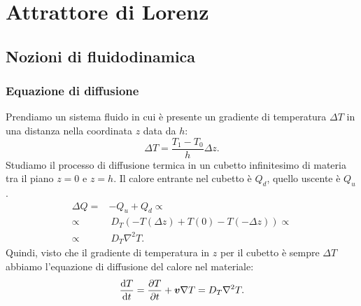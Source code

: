 \section{Attrattore di Lorenz}%
\label{sec:Lezione 24}
\mylocaltoc
\subsection{Nozioni di fluidodinamica}%
\label{sub:Nozioni di fluidodinamica}
\subsubsection{Equazione di diffusione}%
\label{subsub:Equazione di diffusione}
Prendiamo un sistema fluido in cui è presente un gradiente di temperatura $\Delta T$ in una distanza nella coordinata $z$ data da $h$:
\[
    \Delta T = \frac{T_1-T_0}{h}\Delta z
.\] 
Studiamo il processo di diffusione termica in un cubetto infinitesimo di materia tra il piano $z=0$ e $z=h$. Il calore entrante nel cubetto è $Q_d$, quello uscente è $Q_u$.
\[\begin{aligned}
    \Delta Q =& - Q_u+Q_d \propto\\
    \propto & \ D_T (-T(\Delta z)+T(0) - T(-\Delta z)) \propto\\
    \propto & \ D_T \nabla ^2T
.\end{aligned}\]
Quindi, visto che il gradiente di temperatura in $z$ per il cubetto è sempre $\Delta T$ abbiamo l'equazione di diffusione del calore nel materiale:
\[
    \frac{\text{d} T}{\text{d} t} = \frac{\partial T}{\partial t}  + \boldsymbol{v}\nabla T = D_T \nabla ^2T
.\] 
